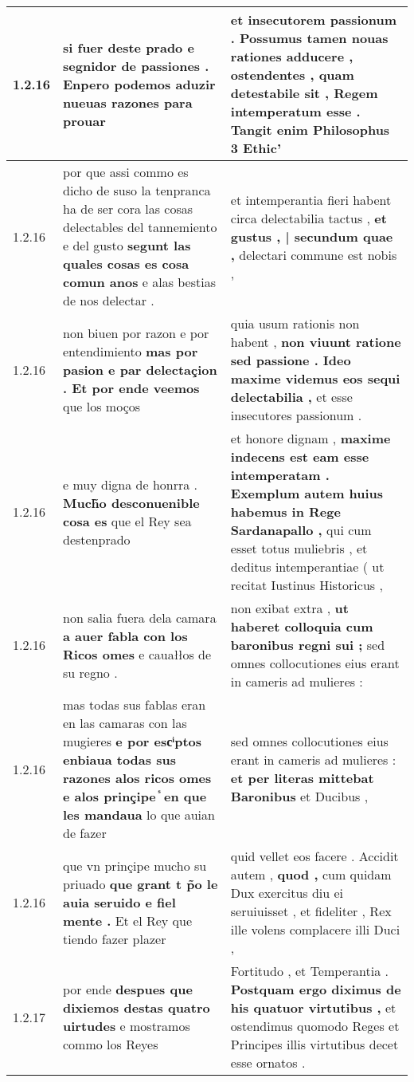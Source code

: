 \begin{tabular}{|p{1cm}|p{6.5cm}|p{6.5cm}|}
1.2.16 & si fuer deste prado e segnidor de passiones . \textbf{ Enpero podemos aduzir nueuas razones } para prouar & et insecutorem passionum . Possumus \textbf{ tamen nouas rationes adducere , ostendentes , } quam detestabile sit , Regem intemperatum esse . Tangit enim Philosophus 3 Ethic’ \\\hline
1.2.16 & por que assi commo es dicho de suso la tenpranca ha de ser cora las cosas delectables del tannemiento e del gusto \textbf{ segunt las quales cosas es cosa comun anos } e alas bestias de nos delectar . & et intemperantia fieri habent circa delectabilia tactus , \textbf{ et gustus , | secundum quae , } delectari commune est nobis , \\\hline
1.2.16 & non biuen por razon e por entendimiento \textbf{ mas por pasion e par delectaçion . Et por ende veemos } que los moços & quia usum rationis non habent , \textbf{ non viuunt ratione sed passione . Ideo maxime videmus eos sequi delectabilia , } et esse insecutores passionum . \\\hline
1.2.16 & e muy digna de honrra . \textbf{ Much̃o desconuenible cosa es } que el Rey sea destenprado & et honore dignam , \textbf{ maxime indecens est eam esse intemperatam . Exemplum autem huius habemus in Rege Sardanapallo , } qui cum esset totus muliebris , et deditus intemperantiae ( ut recitat Iustinus Historicus , \\\hline
1.2.16 & non salia fuera dela camara \textbf{ a auer fabla con los Ricos omes } e cauałłos de su regno . & non exibat extra , \textbf{ ut haberet colloquia cum baronibus regni sui ; } sed omnes collocutiones eius erant in cameris ad mulieres : \\\hline
1.2.16 & mas todas sus fablas eran en las camaras con las mugieres \textbf{ e por escͥptos enbiaua todas sus razones alos ricos omes e alos prinçipe ᷤ en que les mandaua } lo que auian de fazer & sed omnes collocutiones eius erant in cameris ad mulieres : \textbf{ et per literas mittebat Baronibus } et Ducibus , \\\hline
1.2.16 & que vn prinçipe mucho su priuado \textbf{ que grant t p̃o le auia seruido e fiel mente . } Et el Rey que tiendo fazer plazer & quid vellet eos facere . Accidit autem , \textbf{ quod , } cum quidam Dux exercitus diu ei seruiuisset , et fideliter , Rex ille volens complacere illi Duci , \\\hline
1.2.17 & por ende \textbf{ despues que dixiemos destas quatro uirtudes } e mostramos commo los Reyes & Fortitudo , et Temperantia . \textbf{ Postquam ergo diximus de his quatuor virtutibus , } et ostendimus quomodo Reges et Principes illis virtutibus decet esse ornatos . \\\hline

\end{tabular}
